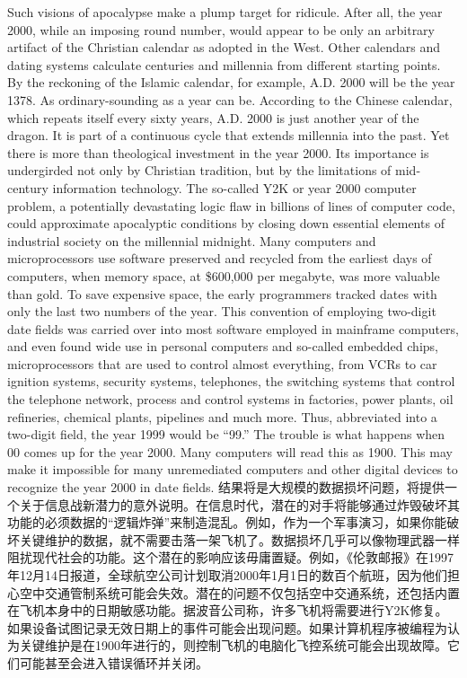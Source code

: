 \begin{paracol}{2}
Such visions of apocalypse make a plump target for ridicule. After all, the year 2000, while an imposing round number, would appear to be only an arbitrary artifact of the Christian calendar as adopted in the West. Other calendars and dating systems calculate centuries and millennia from different starting points. By the reckoning of the Islamic calendar, for example, A.D. 2000 will be the year 1378. As ordinary-sounding as a year can be. According to the Chinese calendar, which repeats itself every sixty years, A.D. 2000 is just another year of the dragon. It is part of a continuous cycle that extends millennia into the past. Yet there is more than theological investment in the year 2000. Its importance is undergirded not only by Christian tradition, but by the limitations of mid-century information technology. The so-called Y2K or year 2000 computer problem, a potentially devastating logic flaw in billions of lines of computer code, could approximate apocalyptic conditions by closing down essential elements of industrial society on the millennial midnight. Many computers and microprocessors use software preserved and recycled from the earliest days of computers, when memory space, at \$600,000 per megabyte, was more valuable than gold. To save expensive space, the early programmers tracked dates with only the last two numbers of the year. This convention of employing two-digit date fields was carried over into most software employed in mainframe computers, and even found wide use in personal computers and so-called embedded chips, microprocessors that are used to control almost everything, from VCRs to car ignition systems, security systems, telephones, the switching systems that control the telephone network, process and control systems in factories, power plants, oil refineries, chemical plants, pipelines and much more. Thus, abbreviated into a two-digit field, the year 1999 would be ``99.'' The trouble is what happens when 00 comes up for the year 2000. Many computers will read this as 1900. This may make it impossible for many unremediated computers and other digital devices to recognize the year 2000 in date fields.
\switchcolumn*
结果将是大规模的数据损坏问题，将提供一个关于信息战新潜力的意外说明。在信息时代，潜在的对手将能够通过炸毁破坏其功能的必须数据的“逻辑炸弹”来制造混乱。例如，作为一个军事演习，如果你能破坏关键维护的数据，就不需要击落一架飞机了。数据损坏几乎可以像物理武器一样阻扰现代社会的功能。这个潜在的影响应该毋庸置疑。例如，《伦敦邮报》在1997年12月14日报道，全球航空公司计划取消2000年1月1日的数百个航班，因为他们担心空中交通管制系统可能会失效。潜在的问题不仅包括空中交通系统，还包括内置在飞机本身中的日期敏感功能。据波音公司称，许多飞机将需要进行Y2K修复。如果设备试图记录无效日期上的事件可能会出现问题。如果计算机程序被编程为认为关键维护是在1900年进行的，则控制飞机的电脑化飞控系统可能会出现故障。它们可能甚至会进入错误循环并关闭。

\end{paracol}
